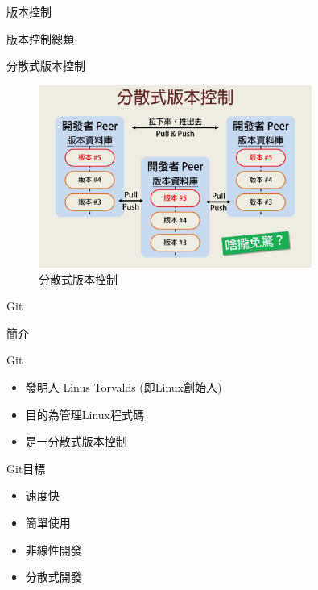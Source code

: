 \documentclass[pdf,15pt]{beamer}
\begin{document}
\begin{section}{版本控制}
\begin{subsection}{版本控制總類}
      \begin{frame}{分散式版本控制}
        \begin{figure}[h!]
          \includegraphics[width=0.8\textwidth]{images/003.jpg} 
          \caption{分散式版本控制}
        \end{figure}
      \end{frame}
    \end{subsection}
  \end{section}

  \begin{section}{Git}
    \begin{subsection}{簡介}
      \begin{frame}{Git}
        \begin{itemize}
          \item 發明人 Linus Torvalds (即Linux創始人)
          \item 目的為管理Linux程式碼
          \item 是一分散式版本控制
        \end{itemize}
      \end{frame}
      
      \begin{frame}{Git目標}
        \begin{itemize}
          \item 速度快
          \item 簡單使用
          \item 非線性開發
          \item 分散式開發
        \end{itemize}
      \end{frame}
    \end{subsection}
   \end{section}
\end{document}
